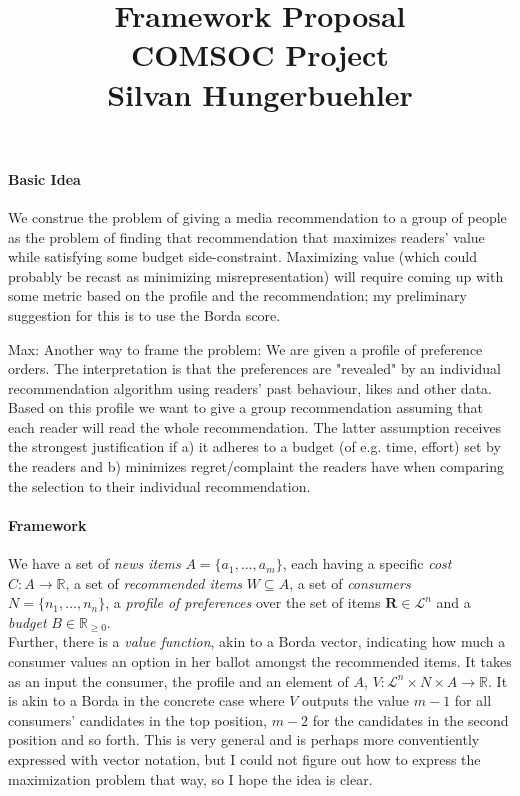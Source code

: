 \documentclass[10pt,a4paper]{article}
\title{
  Framework Proposal\\ \large COMSOC Project
\\
  \large Silvan Hungerbuehler}
\date{}
\begin{document}
\maketitle
\paragraph{Basic Idea}
We construe the problem of giving a media recommendation to a group of people as the problem of finding that recommendation that maximizes readers' value while satisfying some budget side-constraint. Maximizing value (which could probably be recast as minimizing misrepresentation) will require coming up with some metric based on the profile and the recommendation; my preliminary suggestion for this is to use the Borda score.

Max: Another way to frame the problem: We are given a profile of preference orders. The interpretation is that the preferences
are "revealed" by an individual recommendation algorithm using readers' past behaviour, likes and other data. Based on this profile we want to give a group recommendation assuming that each reader will read the whole recommendation. The latter assumption receives the strongest justification if a) it adheres to a budget (of e.g. time, effort) set by the readers and b) minimizes regret/complaint the readers have when comparing the selection to their individual recommendation.

\paragraph{Framework}
We have a set of \emph{news items} $A=\{a_1,...,a_m\}$, each having a specific \emph{cost} $C: A\rightarrow \mathbb{R}$, a set of \emph{recommended items} $W\subseteq A$, a set of \emph{consumers} $N=\{n_1,...,n_n\}$, a \emph{profile of preferences} over the set of items $\mathbf{R}\in \mathcal{L}^n$ and a \emph{budget} $B\in \mathbb{R}_{\geq 0}$.\\
Further, there is a \emph{value function}, akin to a Borda vector, indicating how much a consumer values an option in her ballot amongst the recommended items. It takes as an input the consumer, the profile and an element of $A$,  $V: \mathcal{L}^n \times N \times  A \rightarrow \mathbb{R}$. It is akin to a Borda in the concrete case where $V$ outputs the value $m-1$ for all consumers' candidates in the top position, $m-2$ for the candidates in the second position and so forth. This is very general and is perhaps more conventiently expressed with vector notation, but I could not figure out how to express the maximization problem that way, so I hope the idea is clear.\\
\end{document}
